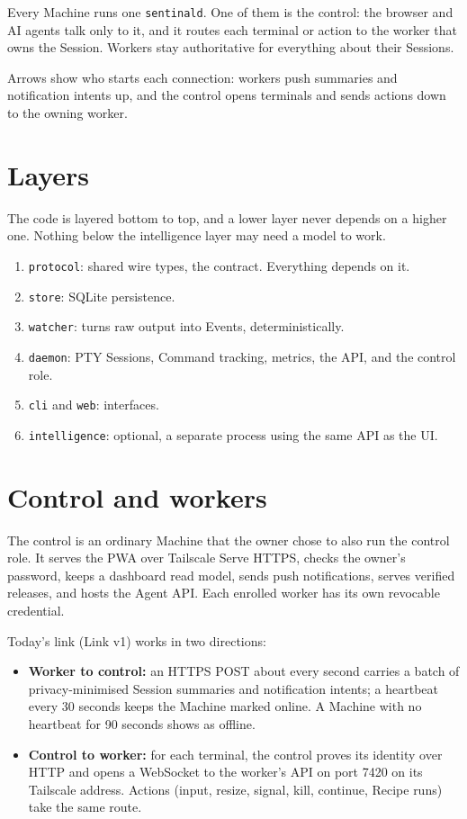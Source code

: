 Every Machine runs one \texttt{sentinald}. One of them is the control: the browser and AI agents talk only to it, and it routes each terminal or action to the worker that owns the Session. Workers stay authoritative for everything about their Sessions.



Arrows show who starts each connection: workers push summaries and notification intents up, and the control opens terminals and sends actions down to the owning worker.

\section{\texorpdfstring{Layers}{Layers}}

The code is layered bottom to top, and a lower layer never depends on a higher one. Nothing below the intelligence layer may need a model to work.

\begin{enumerate}
\item \texttt{protocol}: shared wire types, the contract. Everything depends on it.
\item \texttt{store}: SQLite persistence.
\item \texttt{watcher}: turns raw output into Events, deterministically.
\item \texttt{daemon}: PTY Sessions, Command tracking, metrics, the API, and the control role.
\item \texttt{cli} and \texttt{web}: interfaces.
\item \texttt{intelligence}: optional, a separate process using the same API as the UI.
\end{enumerate}

\section{\texorpdfstring{Control and workers}{Control and workers}}

The control is an ordinary Machine that the owner chose to also run the control role. It serves the PWA over Tailscale Serve HTTPS, checks the owner's password, keeps a dashboard read model, sends push notifications, serves verified releases, and hosts the Agent API. Each enrolled worker has its own revocable credential.

Today's link (Link v1) works in two directions:

\begin{itemize}
\item \textbf{Worker to control:} an HTTPS POST about every second carries a batch of privacy-minimised Session summaries and notification intents; a heartbeat every 30 seconds keeps the Machine marked online. A Machine with no heartbeat for 90 seconds shows as offline.
\item \textbf{Control to worker:} for each terminal, the control proves its identity over HTTP and opens a WebSocket to the worker's API on port 7420 on its Tailscale address. Actions (input, resize, signal, kill, continue, Recipe runs) take the same route.
\end{itemize}

